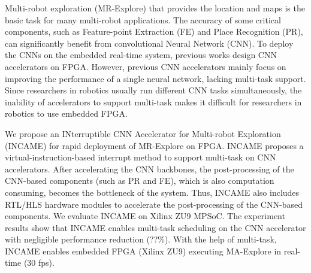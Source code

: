 Multi-robot exploration (MR-Explore) that provides the location and maps is the basic task for many multi-robot applications. 
The accuracy of some critical components, such as Feature-point Extraction (FE) and Place Recognition (PR), can significantly benefit from convolutional Neural Network (CNN). 
To deploy the CNNs on the embedded real-time system, previous works design CNN accelerators on FPGA. 
However, previous CNN accelerators mainly focus on improving the performance of a single neural network, lacking multi-task support.
Since researchers in robotics usually run different CNN tasks simultaneously, the inability of accelerators to support multi-task makes it difficult for researchers in robotics to use embedded FPGA.

We propose an INterruptible CNN Accelerator for Multi-robot Exploration (INCAME) for rapid deployment of MR-Explore on FPGA.
INCAME proposes a virtual-instruction-based interrupt method to support multi-task on CNN accelerators.
After accelerating the CNN backbones, the post-processing of the CNN-based components (such as PR and FE), which is also computation consuming, becomes the bottleneck of the system.
Thus, INCAME also includes RTL/HLS hardware modules to accelerate the post-processing of the CNN-based components.
We evaluate INCAME on Xilinx ZU9 MPSoC. The experiment results show that INCAME enables multi-task scheduling on the CNN accelerator with negligible performance reduction (??\%). With the help of multi-task, INCAME enables embedded FPGA (Xilinx ZU9) executing MA-Explore in real-time (30 fps).

